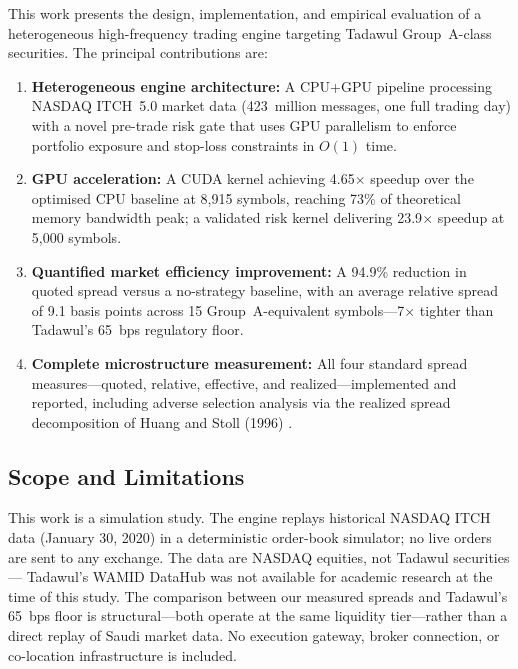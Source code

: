 \documentclass[12pt]{article}
\begin{document}
This work presents the design, implementation, and empirical evaluation of a
heterogeneous high-frequency trading engine targeting Tadawul Group~A-class
securities. The principal contributions are:

\begin{enumerate}
  \item \textbf{Heterogeneous engine architecture:} A CPU+GPU pipeline
        processing NASDAQ ITCH~5.0 market data (423~million messages, one full
        trading day) with a novel pre-trade risk gate that uses GPU parallelism
        to enforce portfolio exposure and stop-loss constraints in $O(1)$ time.

  \item \textbf{GPU acceleration:} A CUDA kernel achieving 4.65$\times$ speedup
        over the optimised CPU baseline at 8{,}915 symbols, reaching 73\% of
        theoretical memory bandwidth peak; a validated risk kernel delivering
        23.9$\times$ speedup at 5{,}000 symbols.

  \item \textbf{Quantified market efficiency improvement:} A 94.9\%
        reduction in quoted spread versus a no-strategy baseline, with an
        average relative spread of 9.1 basis points across 15 Group~A-equivalent
        symbols---7$\times$ tighter than Tadawul's 65~bps regulatory floor.

  \item \textbf{Complete microstructure measurement:} All four standard spread
        measures---quoted, relative, effective, and realized---implemented and
        reported, including adverse selection analysis via the realized spread
        decomposition of Huang and Stoll (1996) \cite{huang1996}.
\end{enumerate}

\subsection{Scope and Limitations}

This work is a simulation study. The engine replays historical NASDAQ ITCH data
(January 30, 2020) in a deterministic order-book simulator; no live orders are
sent to any exchange. The data are NASDAQ equities, not Tadawul securities---
Tadawul's WAMID DataHub was not available for academic research at the time of
this study. The comparison between our measured spreads and Tadawul's 65~bps
floor is structural---both operate at the same liquidity tier---rather than a
direct replay of Saudi market data. No execution gateway, broker connection, or
co-location infrastructure is included.
\end{document}
